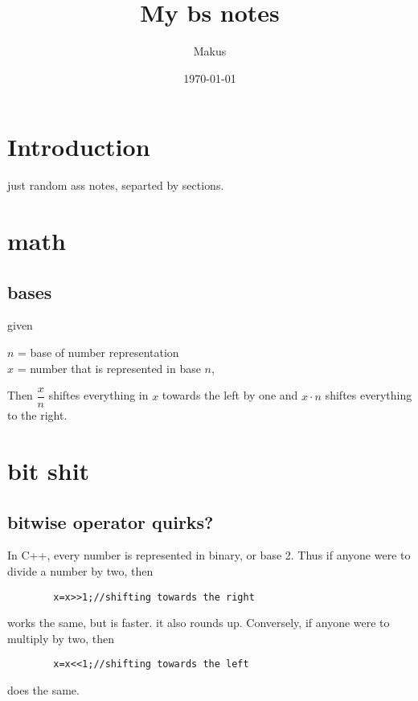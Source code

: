 \documentclass{article} %
\title{My bs notes}
\author{Makus}
\date{\today}
\begin{document}
\maketitle


\tableofcontents

\section{Introduction}
    \begin{center}
        just random ass notes, separted by sections.
    \end{center}
\section{math}
    \subsection{bases}
        given  \begin{center}
            $n$ = base of number representation\\
            $x$ = number that is represented in base $n$,
        \end{center}
        Then $\dfrac{x}{n}$ shiftes everything in $x$ towards the left by one and $x\cdot n$ shiftes everything to the right.
\section{bit shit}
\subsection{bitwise operator quirks?}
    In C++, every number is represented in binary, or base 2. Thus if anyone were to divide a number by two, then
    \begin{verbatim}
        x=x>>1;//shifting towards the right
    \end{verbatim}
    works the same, but is faster. it also rounds up. Conversely, if anyone were to multiply by two, then 
    \begin{verbatim}
        x=x<<1;//shifting towards the left
    \end{verbatim}
    does the same.
\end{document}
